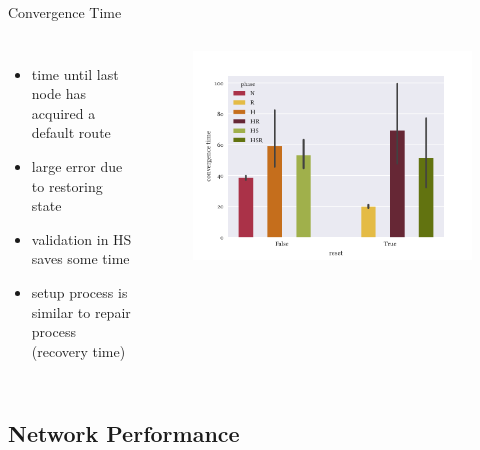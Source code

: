 \documentclass[fleqn,11pt,aspectratio=1610]{beamer}
\begin{document}
\begin{frame}{Convergence Time}
  \begin{columns}
    \begin{itemize}
      \item<1-> time until last node has acquired a default route
      \item<2-> large error due to restoring state
      \item<3-> validation in HS saves some time
      \item<4-> setup process is similar to repair process (\textcolor{tubsRed}{recovery time})
    \end{itemize}
    \begin{figure}
      \centering
      \includegraphics[width=\textwidth]{../images/convergence.pdf}
    \end{figure}
  \end{columns}
\end{frame}

\subsection{Network Performance}
\end{document}
